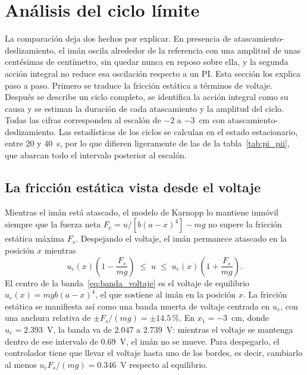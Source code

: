 \section{Análisis del ciclo límite}
\label{sec:analisis_ciclo}

La comparación deja dos hechos por explicar. En presencia de atascamiento-deslizamiento, el imán oscila alrededor de la referencia con una amplitud de unas centésimas de centímetro, sin quedar nunca en reposo sobre ella, y la segunda acción integral no reduce esa oscilación respecto a un PI. Esta sección los explica paso a paso. Primero se traduce la fricción estática a términos de voltaje. Después se describe un ciclo completo, se identifica la acción integral como su causa y se estiman la duración de cada atascamiento y la amplitud del ciclo. Todas las cifras corresponden al escalón de $-2$ a $-3$~cm con atascamiento-deslizamiento. Las estadísticas de los ciclos se calculan en el estado estacionario, entre 20 y 40~s, por lo que difieren ligeramente de las de la tabla~\ref{tab:pi_pii}, que abarcan todo el intervalo posterior al escalón.

\subsection{La fricción estática vista desde el voltaje}

Mientras el imán está atascado, el modelo de Karnopp lo mantiene inmóvil siempre que la fuerza neta $F_e = u/[b(a-x)^4] - mg$ no supere la fricción estática máxima $F_s$. Despejando el voltaje, el imán permanece atascado en la posición $x$ mientras
\begin{equation}
u_e(x)\left(1-\frac{F_s}{mg}\right) \;\le\; u \;\le\; u_e(x)\left(1+\frac{F_s}{mg}\right) .
\label{eq:banda_voltaje}
\end{equation}
El centro de la banda~\eqref{eq:banda_voltaje} es el voltaje de equilibrio $u_e(x)=mgb(a-x)^4$, el que sostiene al imán en la posición $x$. La fricción estática se manifiesta así como una banda muerta de voltaje centrada en $u_e$, con una anchura relativa de $\pm F_s/(mg)=\pm14.5$\,\%. En $x_1=-3$~cm, donde $u_e=2.393$~V, la banda va de $2.047$ a $2.739$~V: mientras el voltaje se mantenga dentro de ese intervalo de $0.69$~V, el imán no se mueve. Para despegarlo, el controlador tiene que llevar el voltaje hasta uno de los bordes, es decir, cambiarlo al menos $u_e F_s/(mg)=0.346$~V respecto al equilibrio.

